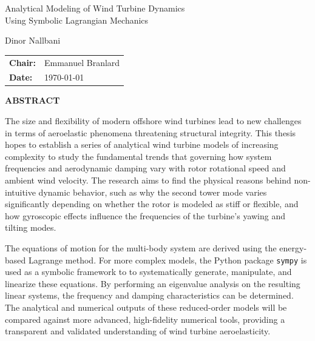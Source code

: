 \documentclass[onecolumn,draftcls]{IEEEtran}
\begin{document}
\begin{titlepage}
    \centering
    \vspace*{1in} %

    {\huge{Analytical Modeling of Wind Turbine Dynamics\\[0.5em] Using Symbolic Lagrangian Mechanics}}\par

    \vspace{2em}

    {\Large Dinor Nallbani}\par

    \vfill

    \begin{tabular}{ l l }
        \textbf{Chair:} & Emmanuel Branlard \\
        \textbf{Date:}  & \today
    \end{tabular}

    \vfill
\end{titlepage}

\newpage
\begin{center}
    \textbf{ABSTRACT}
\end{center}
\vspace{1em}

\noindent
The size and flexibility of modern offshore wind turbines lead to new challenges in terms of aeroelastic phenomena threatening structural integrity. This thesis hopes to establish a series of analytical wind turbine models of increasing complexity to study the fundamental trends that governing how system frequencies and aerodynamic damping vary with rotor rotational speed and ambient wind velocity. The research aims to find the physical reasons behind non-intuitive dynamic behavior, such as why the second tower mode varies significantly depending on whether the rotor is modeled as stiff or flexible, and how gyroscopic effects influence the frequencies of the turbine's yawing and tilting modes.

The equations of motion for the multi-body system are derived using the energy-based Lagrange method. For more complex models, the Python package \texttt{sympy} is used as a symbolic framework to to systematically generate, manipulate, and linearize these equations. By performing an eigenvalue analysis on the resulting linear systems, the frequency and damping characteristics can be determined. The analytical and numerical outputs of these reduced-order models will be compared against more advanced, high-fidelity numerical tools, providing a transparent and validated understanding of wind turbine aeroelasticity.
\end{document}
